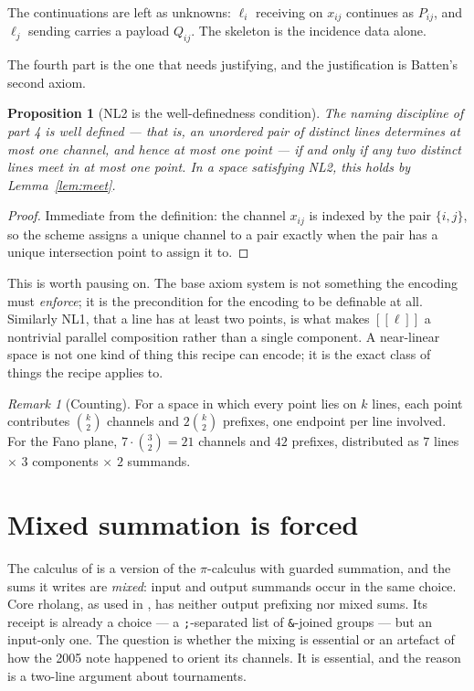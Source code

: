 \documentclass[11pt]{article}
\theoremstyle{plain}
\newtheorem{proposition}[theorem]{Proposition}
\theoremstyle{definition}
\theoremstyle{remark}
\newtheorem{remark}[theorem]{Remark}
\newcommand{\enc}[1]{[\![#1]\!]}
\begin{document}
The continuations are left as unknowns: $\ell_i$ receiving on $x_{ij}$ continues as
$P_{ij}$, and $\ell_j$ sending carries a payload $Q_{ij}$. The skeleton is the incidence
data alone.

The fourth part is the one that needs justifying, and the justification is Batten's second
axiom.

\begin{proposition}[NL2 is the well-definedness condition]
\label{prop:naming}
The naming discipline of part \textup{4} is well defined --- that is, an unordered pair of
distinct lines determines at most one channel, and hence at most one point --- if and only
if any two distinct lines meet in at most one point. In a space satisfying \textup{NL2},
this holds by Lemma~\ref{lem:meet}.
\end{proposition}

\begin{proof}
Immediate from the definition: the channel $x_{ij}$ is indexed by the pair $\{i,j\}$, so
the scheme assigns a unique channel to a pair exactly when the pair has a unique
intersection point to assign it to.
\end{proof}

This is worth pausing on. The base axiom system is not something the encoding must
\emph{enforce}; it is the precondition for the encoding to be definable at all. Similarly
NL1, that a line has at least two points, is what makes $\enc{\ell}$ a nontrivial parallel
composition rather than a single component. A near-linear space is not one kind of thing
this recipe can encode; it is the exact class of things the recipe applies to.

\begin{remark}[Counting]
For a space in which every point lies on $k$ lines, each point contributes $\binom{k}{2}$
channels and $2\binom{k}{2}$ prefixes, one endpoint per line involved. For the Fano plane,
$7 \cdot \binom{3}{2} = 21$ channels and $42$ prefixes, distributed as $7$ lines $\times$
$3$ components $\times$ $2$ summands.
\end{remark}

\section{Mixed summation is forced}
\label{sec:mixed}

The calculus of \cite{Fano05} is a version of the $\pi$-calculus with guarded summation,
and the sums it writes are \emph{mixed}: input and output summands occur in the same
choice. Core rholang, as used in \cite{KnotsNote}, has neither output prefixing nor mixed
sums. Its receipt is already a choice --- a \texttt{;}-separated list of
\texttt{\&}-joined groups --- but an input-only one. The question is whether the mixing is
essential or an artefact of how the 2005 note happened to orient its channels. It is
essential, and the reason is a two-line argument about tournaments.
\end{document}
